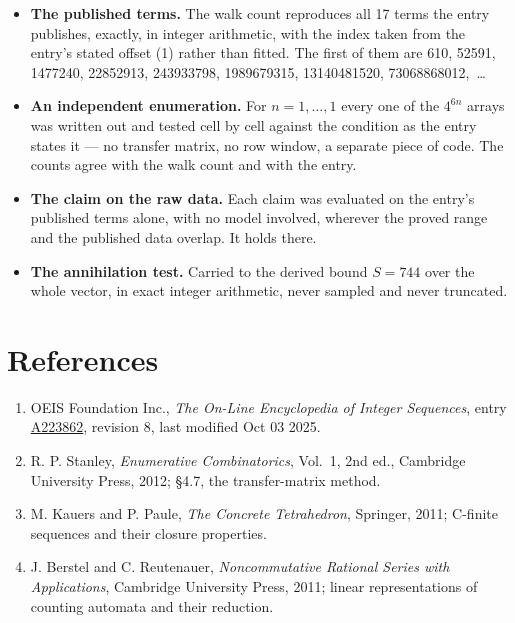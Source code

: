 \documentclass[11pt]{article}
\theoremstyle{definition}
\begin{document}
\begin{itemize}

\item {\bfseries The published terms.} The walk count reproduces all 17 terms the entry publishes, exactly, in integer arithmetic, with the index taken from the entry's stated offset (1) rather than fitted. The first of them are 610, 52591, 1477240, 22852913, 243933798, 1989679315, 13140481520, 73068868012,~\dots

\item {\bfseries An independent enumeration.} For $n = 1,\dots,1$ every one of the $4^{6n}$ arrays was written out and tested cell by cell against the condition as the entry states it --- no transfer matrix, no row window, a separate piece of code. The counts agree with the walk count and with the entry.

\item {\bfseries The claim on the raw data.} Each claim was evaluated on the entry's published terms alone, with no model involved, wherever the proved range and the published data overlap. It holds there.

\item {\bfseries The annihilation test.} Carried to the derived bound $S = 744$ over the whole vector, in exact integer arithmetic, never sampled and never truncated.

\end{itemize}

\section{References}

\begin{enumerate}

\item OEIS Foundation Inc., \emph{The On-Line Encyclopedia of Integer Sequences}, entry \href{https://oeis.org/A223862}{A223862}, revision 8, last modified Oct 03 2025.

\item R. P. Stanley, \emph{Enumerative Combinatorics}, Vol.~1, 2nd ed., Cambridge University Press, 2012; \S4.7, the transfer-matrix method.

\item M. Kauers and P. Paule, \emph{The Concrete Tetrahedron}, Springer, 2011; C-finite sequences and their closure properties.

\item J. Berstel and C. Reutenauer, \emph{Noncommutative Rational Series with Applications}, Cambridge University Press, 2011; linear representations of counting automata and their reduction.

\end{enumerate}
\end{document}
